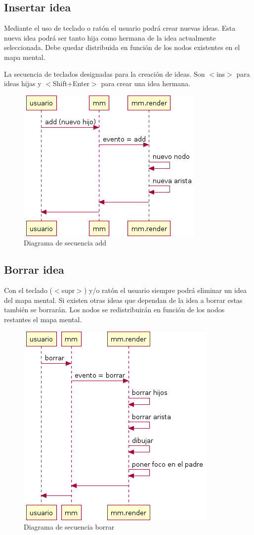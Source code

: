 \subsection{Insertar idea}
Mediante el uso de teclado o ratón el usuario podrá crear nuevas ideas. Esta nueva idea podrá ser tanto hija como hermana de la idea actualmente seleccionada. Debe quedar distribuida en función de los nodos existentes en el mapa mental. 

La secuencia de teclados designadas para la creación de ideas. Son $<$ins$>$ para ideas hijas y $<$Shift+Enter$>$ para crear una idea hermana. 

\begin{figure}[tbph]
\centering
\includegraphics[width=0.4\linewidth]{imagenes/diagrama-seq-add}
\caption{Diagrama de secuencia add}
\label{fig:diagrama-seq-add}
\end{figure}


\subsection{Borrar idea}
Con el teclado ($<$supr$>$) y/o ratón el usuario siempre podrá eliminar un idea del mapa mental. Si existen otras ideas que dependan de la idea a borrar estas también se borrarán. Los nodos se redistribuirán en función de los nodos restantes el mapa mental. 

\begin{figure}[tbph]
\centering
\includegraphics[width=0.4\linewidth]{imagenes/diagrama-seq-borrar}
\caption{Diagrama de secuencia borrar}
\label{fig:diagrama-seq-borrar}
\end{figure}


